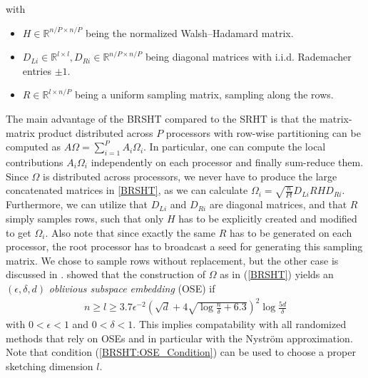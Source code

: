 \documentclass{article}
\theoremstyle{definition}
\begin{document}
with 
\begin{itemize}
    \item $H\in \mathbb{R}^{n/P \times n/P}$ being the normalized Walsh–Hadamard matrix.
    \item $D_{L i}\in \mathbb{R}^{l \times l}, D_{R i}\in \mathbb{R}^{n/P \times n/P}$ being diagonal matrices with i.i.d. Rademacher entries $\pm 1$.
    \item $R\in \mathbb{R}^{l \times n/P}$ being a  uniform sampling matrix, sampling along the rows.
\end{itemize}
The main advantage of the BRSHT compared to the SRHT is that the matrix-matrix product distributed across $P$ processors with row-wise partitioning can be computed as $A\Omega = \sum_{i=1}^P A_i \Omega_i$. In particular, one can compute the local contributions $A_i \Omega_i$ independently on each processor and finally sum-reduce them. Since $\Omega$ is distributed across processors, we never have to produce the large concatenated matrices in \eqref{BRSHT}, as we can calculate $\Omega_i=\sqrt{\frac{n}{Pl}} D_{Li} R H D_{Ri}$. Furthermore, we can utilize that $D_{Li}$ and $D_{Ri}$ are diagonal matrices, and that $R$ simply samples rows, such that only $H$ has to be explicitly created and modified to get $\Omega_i$. Also note that since exactly the same $R$ has to be generated on each processor, the root processor has to broadcast a seed for generating this sampling matrix. We chose to sample rows without replacement, but the other case is discussed in \cite{balabanov2022}. \citeauthor{balabanov2022} \cite{balabanov2022} showed that the construction of $\Omega$ as in (\ref{BRSHT}) yields an $(\epsilon, \delta, d)$ \textit{oblivious subspace embedding} (OSE) if
\begin{align}
    \label{BRSHT:OSE_Condition}
    n \geq l \geq 3.7 \epsilon^{-2} 
    \left( 
        \sqrt{d} + 4 \sqrt{\log \frac{n}{\delta} + 6.3}
    \right)^2
    \log \frac{5d}{\delta}
\end{align}
with $0 < \epsilon < 1$ and $0 < \delta < 1$. This implies compatability with all randomized methods that rely on OSEs and in particular with the Nyström approximation. Note that condition (\ref{BRSHT:OSE_Condition}) can be used to choose a proper sketching dimension $l$.
\end{document}
